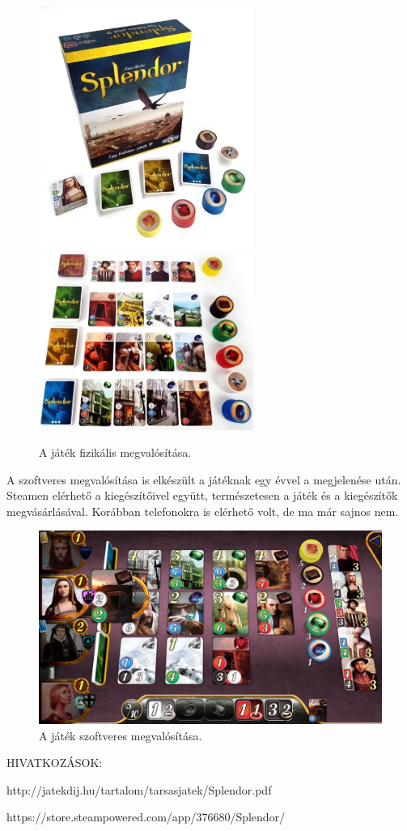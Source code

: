 \begin{figure}[h]
\centering
\includegraphics[width=7cm]{images/physical_edition1.jpg}
\hspace{1cm}
\includegraphics[width=7cm]{images/physical_edition2.jpg}
\caption{A játék fizikális megvalósítása.}
\label{fig:physical}
\end{figure}

\newpage


A szoftveres megvalósítása is elkészült a játéknak egy évvel a megjelenése után. Steamen elérhető a kiegészítőivel együtt, természetesen a játék és a kiegészítők megvásárlásával. Korábban telefonokra is elérhető volt, de ma már sajnos nem.

\begin{figure}[h]
\centering
\includegraphics[scale=0.2]{images/digital_edition.jpg}
\caption{A játék szoftveres megvalósítása.}
\label{fig:digital}
\end{figure}


\vspace{3cm}
HIVATKOZÁSOK:\par
http://jatekdij.hu/tartalom/tarsasjatek/Splendor.pdf\par
https://store.steampowered.com/app/376680/Splendor/

